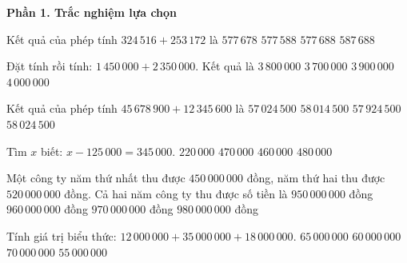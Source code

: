 \textbf{Phần 1. Trắc nghiệm lựa chọn}

\begin{ex} %
Kết quả của phép tính $324\,516 + 253\,172$ là
\choice
{$577\,678$}
{$577\,588$}
{\True $577\,688$}
{$587\,688$}
\end{ex}

\begin{ex} %
Đặt tính rồi tính: $1\,450\,000 + 2\,350\,000$. Kết quả là
\choice
{\True $3\,800\,000$}
{$3\,700\,000$}
{$3\,900\,000$}
{$4\,000\,000$}
\end{ex}

\begin{ex} %
Kết quả của phép tính $45\,678\,900 + 12\,345\,600$ là
\choice
{$57\,024\,500$}
{$58\,014\,500$}
{$57\,924\,500$}
{\True $58\,024\,500$}
\end{ex}

\begin{ex} %
Tìm $x$ biết: $x - 125\,000 = 345\,000$.
\choice
{$220\,000$}
{\True $470\,000$}
{$460\,000$}
{$480\,000$}
\end{ex}

\begin{ex} %
Một công ty năm thứ nhất thu được $450\,000\,000$ đồng, năm thứ hai thu được $520\,000\,000$ đồng. Cả hai năm công ty thu được số tiền là
\choice
{$950\,000\,000$ đồng}
{$960\,000\,000$ đồng}
{\True $970\,000\,000$ đồng}
{$980\,000\,000$ đồng}
\end{ex}

\begin{ex} %
Tính giá trị biểu thức: $12\,000\,000 + 35\,000\,000 + 18\,000\,000$.
\choice
{\True $65\,000\,000$}
{$60\,000\,000$}
{$70\,000\,000$}
{$55\,000\,000$}
\end{ex}

